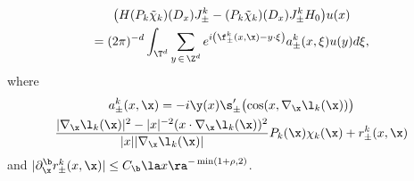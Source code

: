 \begin{lemm}\label{HJ-JH_0 lem}
\begin{multline*}
\bigl(H (P_k \tilde\chi_k)(D_x)J_\pm^k - (P_k \tilde\chi_k)(D_x)J_\pm^k H_0\bigr)u(x)\\
= (2\pi)^{-d}\int_{\T^d}\sum_{y\,\in\,\Z^d}e^{i\left(\f_\pm^k(x,\x)-y\cdot\xi\right)}a_\pm^k(x,\xi)u(y)d\xi,
\end{multline*}
where
\begin{multline}\label{s_a def}
a_\pm^k(x,\x)
= - i \y(x)\s_\pm'\bigl(\cos(x,\nabla_\x \l_k(\x))\bigr) \\
\frac{|\nabla_\x \l_k(\x)|^2 - |x|^{-2} (x\cdot\nabla_\x \l_k(\x))^2}{|x| |\nabla_\x \l_k(\x)|} P_k(\x) \chi_k(\x) 
 + r_\pm^k(x,\x) 
\end{multline}
and $|\partial_\x^\b r_\pm^k(x,\x)| \leq C_\b \la x \ra^{-\min(1+\rho,2)}$.
\end{lemm}
